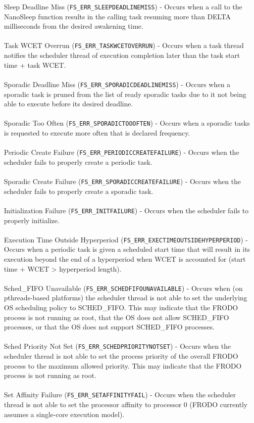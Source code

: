 Sleep Deadline Miss (\texttt{FS\_ERR\_SLEEPDEADLINEMISS}) - Occurs when a call to the NanoSleep function results in the calling task resuming more than DELTA milliseconds from the desired awakening time.
\\
\\
Task WCET Overrun (\texttt{FS\_ERR\_TASKWCETOVERRUN}) - Occurs when a task thread notifies the scheduler thread of execution completion later than the task start time + task WCET.
\\
\\
Sporadic Deadline Miss (\texttt{FS\_ERR\_SPORADICDEADLINEMISS}) - Occurs when a sporadic task is pruned from the list of ready sporadic tasks due to it not being able to execute before its desired deadline.
\\
\\
Sporadic Too Often (\texttt{FS\_ERR\_SPORADICTOOOFTEN}) - Occurs when a sporadic tasks is requested to execute more often that is declared frequency.
\\
\\
Periodic Create Failure (\texttt{FS\_ERR\_PERIODICCREATEFAILURE}) - Occurs when the scheduler fails to properly create a periodic task.
\\
\\
Sporadic Create Failure (\texttt{FS\_ERR\_SPORADICCREATEFAILURE}) - Occurs when the scheduler fails to properly create a sporadic task.
\\
\\
Initialization Failure (\texttt{FS\_ERR\_INITFAILURE}) - Occurs when the scheduler fails to properly initialize.
\\
\\
Execution Time Outside Hyperperiod (\texttt{FS\_ERR\_EXECTIMEOUTSIDEHYPERPERIOD}) - Occurs when a periodic task is given a scheduled start time that will result in its execution beyond the end of a hyperperiod when WCET is accounted for (start time + WCET > hyperperiod length).
\\
\\
Sched\_FIFO Unavailable (\texttt{FS\_ERR\_SCHEDFIFOUNAVAILABLE}) - Occurs when (on pthreads-based platforms) the scheduler thread is not able to set the underlying OS scheduling policy to SCHED\_FIFO.  This may indicate that the FRODO process is not running as root, that the OS does not allow SCHED\_FIFO processes, or that the OS does not support SCHED\_FIFO processes.
\\
\\
Sched Priority Not Set (\texttt{FS\_ERR\_SCHEDPRIORITYNOTSET}) - Occurs when the scheduler thread is not able to set the process priority of the overall FRODO process to the maximum allowed priority.  This may indicate that the FRODO process is not running as root.
\\
\\
Set Affinity Failure (\texttt{FS\_ERR\_SETAFFINITYFAIL}) - Occurs when the scheduler thread is not able to set the processor affinity to processor 0 (FRODO currently assumes a single-core execution model).
\\

